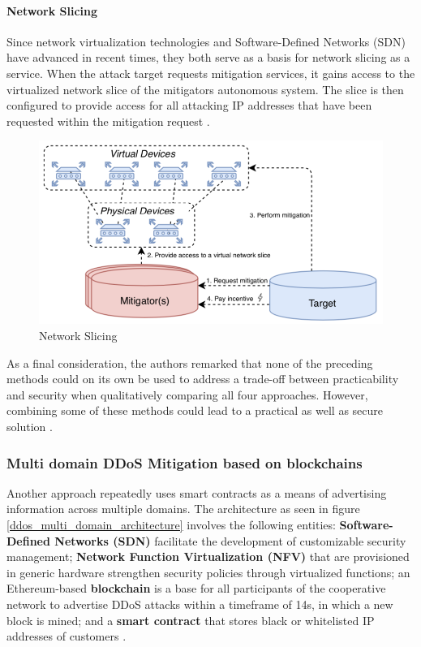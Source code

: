 \paragraph{Network Slicing}
Since network virtualization technologies and Software-Defined Networks (SDN) have advanced in recent times, they both serve as a basis for network slicing as a service. When the attack target requests mitigation services, it gains access to the virtualized network slice of the mitigators autonomous system. The slice is then configured to provide access for all attacking IP addresses that have been requested within the mitigation request \cite{Mannhart2018}.
\begin{figure}[ht]
  \begin{center}
    \includegraphics[scale=0.5]{Talk7/img/ddos/cooperative_network_network_slicing}
  \end{center}
  \caption{Network Slicing}
  \label{ddos_network_slicing}
\end{figure}

As a final consideration, the authors remarked that none of the preceding methods could on its own be used to address a trade-off between practicability and security when qualitatively comparing all four approaches. However, combining some of these methods could lead to a practical as well as secure solution \cite{Mannhart2018}.

\subsubsection{Multi domain DDoS Mitigation based on blockchains}
Another approach repeatedly uses smart contracts as a means of advertising information across multiple domains. The architecture as seen in figure \ref{ddos_multi_domain_architecture} involves the following entities: \textbf{Software-Defined Networks (SDN)} facilitate the development of customizable security management; \textbf{Network Function Virtualization (NFV)} that are provisioned in generic hardware strengthen security policies through virtualized functions; an Ethereum-based \textbf{blockchain} is a base for all participants of the cooperative network to advertise DDoS attacks within a timeframe of 14s, in which a new block is mined; and a \textbf{smart contract} that stores black or whitelisted IP addresses of customers \cite{Rodrigues2017}.

